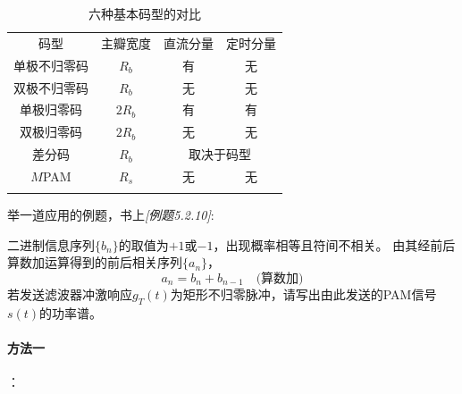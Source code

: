     \begin{table}[H]
        \centering
        \caption{六种基本码型的对比}
        \begin{tabular}{c|c|c|c}
            \Xhline{1pt}
            \textcolor{bupt}{码型} & \textcolor{bupt}{主瓣宽度} & \textcolor{bupt}{直流分量} & \textcolor{bupt}{定时分量}\\ \Xhline{0.5pt}
            \textcolor{bupt}{单极不归零码} & $R_b$ & 有 & 无      \\ \Xhline{0.5pt}
            \textcolor{bupt}{双极不归零码} & $R_b$ & 无 & 无      \\ \Xhline{0.5pt}
            \textcolor{bupt}{单极归零码}   & $2R_b$ & 有 & 有     \\ \Xhline{0.5pt}
            \textcolor{bupt}{双极归零码}   & $2R_b$ & 无 & 无     \\ \Xhline{0.5pt}
            \textcolor{bupt}{差分码}      & $R_b$  & \multicolumn{2}{c}{取决于码型} \\ \Xhline{0.5pt} 
            \textcolor{bupt}{$M$PAM}     & $R_s$ & 无 & 无 \\ \Xhline{1pt}
        \end{tabular}
    \end{table}

    举一道应用的例题，书上\emph{[例题5.2.10]}:

    二进制信息序列$\{b_n\}$的取值为$+1$或$-1$，出现概率相等且符间不相关。
    由其经前后算数加运算得到的前后相关序列$\{a_n\}$，
    \begin{equation}
        a_n=b_n+b_{n-1}\hspace{1em}\text{(算数加)}
    \end{equation}
    若发送滤波器冲激响应$g_T(t)$为矩形不归零脉冲，请写出由此发送的PAM信号$s(t)$的功率谱。

    \paragraph{方法一}：

